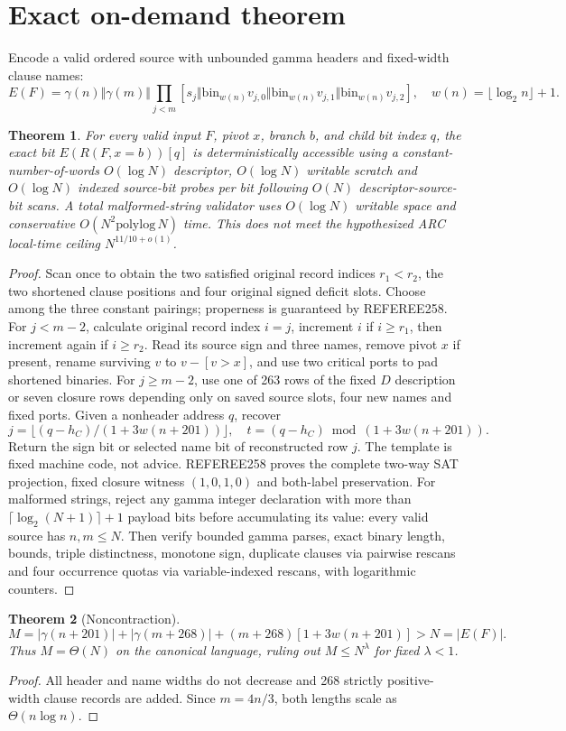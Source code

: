 \documentclass[11pt]{article}
\newtheorem{theorem}{Theorem}
\begin{document}
\section{Exact on-demand theorem}
Encode a valid ordered source with unbounded gamma headers and fixed-width clause names:
\[
 E(F)=\gamma(n)\Vert\gamma(m)\Vert
 \prod_{j<m}[s_j\Vert\mathrm{bin}_{w(n)}v_{j,0}
 \Vert\mathrm{bin}_{w(n)}v_{j,1}\Vert\mathrm{bin}_{w(n)}v_{j,2}],\quad
 w(n)=\lfloor\log_2 n\rfloor+1.
\]
\begin{theorem}
For every valid input $F$, pivot $x$, branch $b$, and child bit index $q$, the exact bit $E(R(F,x=b))[q]$ is deterministically accessible using a constant-number-of-words $O(\log N)$ descriptor, $O(\log N)$ writable scratch and $O(\log N)$ indexed source-bit probes per bit following $O(N)$ descriptor-source-bit scans. A total malformed-string validator uses $O(\log N)$ writable space and conservative $O(N^2\mathrm{polylog}\,N)$ time. This does not meet the hypothesized ARC local-time ceiling $N^{11/10+o(1)}$.
\end{theorem}
\begin{proof}
Scan once to obtain the two satisfied original record indices $r_1<r_2$, the two shortened clause positions and four original signed deficit slots. Choose among the three constant pairings; properness is guaranteed by REFEREE258. For $j<m-2$, calculate original record index $i=j$, increment $i$ if $i\ge r_1$, then increment again if $i\ge r_2$. Read its source sign and three names, remove pivot $x$ if present, rename surviving $v$ to $v-[v>x]$, and use two critical ports to pad shortened binaries. For $j\ge m-2$, use one of 263 rows of the fixed $D$ description or seven closure rows depending only on saved source slots, four new names and fixed ports. Given a nonheader address $q$, recover
\[
j=\lfloor(q-h_C)/(1+3w(n+201))\rfloor,\quad
t=(q-h_C)\bmod(1+3w(n+201)).
\]
Return the sign bit or selected name bit of reconstructed row $j$. The template is fixed machine code, not advice. REFEREE258 proves the complete two-way SAT projection, fixed closure witness $(1,0,1,0)$ and both-label preservation. For malformed strings, reject any gamma integer declaration with more than $\lceil\log_2(N+1)\rceil+1$ payload bits before accumulating its value: every valid source has $n,m\le N$. Then verify bounded gamma parses, exact binary length, bounds, triple distinctness, monotone sign, duplicate clauses via pairwise rescans and four occurrence quotas via variable-indexed rescans, with logarithmic counters.
\end{proof}
\begin{theorem}[Noncontraction]
\[
 M=|\gamma(n+201)|+|\gamma(m+268)|+
 (m+268)[1+3w(n+201)]>N=|E(F)|.
\]
Thus $M=\Theta(N)$ on the canonical language, ruling out $M\le N^\lambda$ for fixed $\lambda<1$.
\end{theorem}
\begin{proof}
All header and name widths do not decrease and 268 strictly positive-width clause records are added. Since $m=4n/3$, both lengths scale as $\Theta(n\log n)$.
\end{proof}
\end{document}
